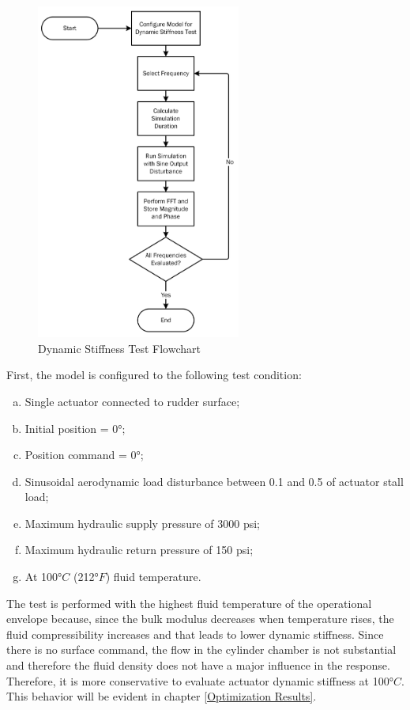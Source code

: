 \begin{figure}[H]
	\centering
	\centerline{\includegraphics[width=0.6\textwidth]{Figuras/4.DynamicStifinessOptimizationAlgorithm/4-4-1-DynamicStiffnessTest.jpg}}
	\caption{Dynamic Stiffness Test Flowchart}
	\label{fig:4_4_1_DynamicStiffnessTestFlowchart}
\end{figure}

First, the model is configured to the following test condition:

\begin{enumerate}[a)]
	\item Single actuator connected to rudder surface;	
	\item Initial position = 0$°$;
	\item Position command = 0$°$;
	\item Sinusoidal aerodynamic load disturbance between 0.1 and 0.5 of actuator stall load;
	\item Maximum hydraulic supply pressure of 3000 psi;
	\item Maximum hydraulic return pressure of 150 psi;	
	\item At 100$°C$ (212$°F$) fluid temperature.	
\end{enumerate}

The test is performed with the highest fluid temperature of the operational envelope because, since the bulk modulus decreases when temperature rises, the fluid compressibility increases and that leads to lower dynamic stiffness. Since there is no surface command,  the flow in the cylinder chamber is not substantial and therefore the fluid density does not have a major influence in the response. Therefore, it is more conservative to evaluate actuator dynamic stiffness at 100$°C$. This behavior will be evident in chapter \ref{Optimization Results}.

